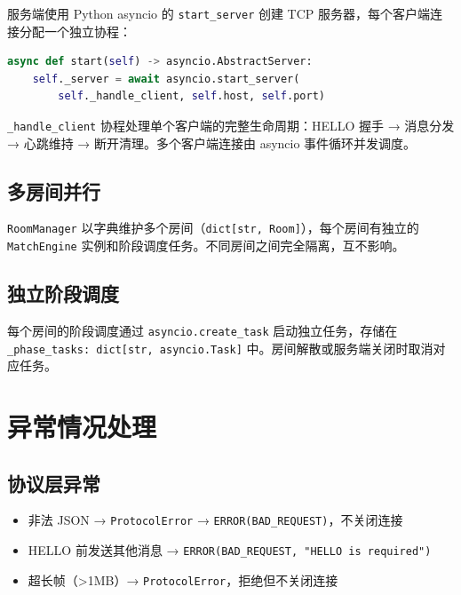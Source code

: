 \documentclass[12pt,a4paper]{ctexbook}
\begin{document}
服务端使用 Python asyncio 的 \texttt{start\_server} 创建 TCP 服务器，每个客户端连接分配一个独立协程：

\begin{lstlisting}[language=Python,caption={连接处理（tcp\_gateway.py）}]
async def start(self) -> asyncio.AbstractServer:
    self._server = await asyncio.start_server(
        self._handle_client, self.host, self.port)
\end{lstlisting}

\texttt{\_handle\_client} 协程处理单个客户端的完整生命周期：HELLO 握手 → 消息分发 → 心跳维持 → 断开清理。多个客户端连接由 asyncio 事件循环并发调度。

\section{多房间并行}

\texttt{RoomManager} 以字典维护多个房间（\texttt{dict[str, Room]}），每个房间有独立的 \texttt{MatchEngine} 实例和阶段调度任务。不同房间之间完全隔离，互不影响。

\section{独立阶段调度}

每个房间的阶段调度通过 \texttt{asyncio.create\_task} 启动独立任务，存储在 \texttt{\_phase\_tasks: dict[str, asyncio.Task]} 中。房间解散或服务端关闭时取消对应任务。

\chapter{异常情况处理}

\section{协议层异常}

\begin{itemize}
  \item 非法 JSON → \texttt{ProtocolError} → \texttt{ERROR(BAD\_REQUEST)}，不关闭连接
  \item HELLO 前发送其他消息 → \texttt{ERROR(BAD\_REQUEST, "HELLO is required")}
  \item 超长帧（>1MB）→ \texttt{ProtocolError}，拒绝但不关闭连接
\end{itemize}
\end{document}
